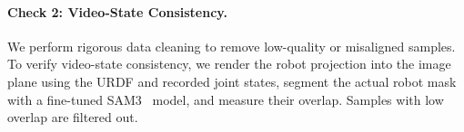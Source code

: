 
\paragraph{Check 2: Video-State Consistency.} 
We perform rigorous data cleaning to remove low-quality or misaligned samples.
To verify video-state consistency, we render the robot projection into the image plane using the URDF and recorded joint states, segment the actual robot mask with a fine-tuned SAM3~\citep{carion2025sam3segmentconcepts} model, and measure their overlap. Samples with low overlap are filtered out.


